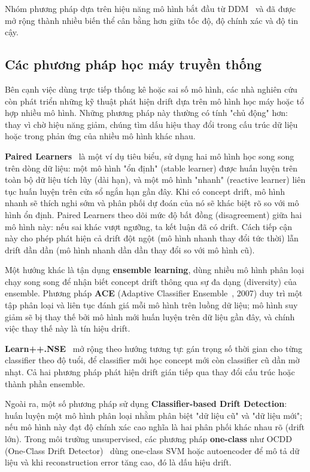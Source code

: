 Nhóm phương pháp dựa trên hiệu năng mô hình bắt đầu từ DDM~\cite{gama2004learning} và đã được mở rộng thành nhiều biến thể cân bằng hơn giữa tốc độ, độ chính xác và độ tin cậy.

\subsection{Các phương pháp học máy truyền thống}
Bên cạnh việc dùng trực tiếp thống kê hoặc sai số mô hình, các nhà nghiên cứu còn phát triển những kỹ thuật phát hiện drift dựa trên
mô hình học máy hoặc tổ hợp nhiều mô hình. Những phương pháp này thường có tính "chủ động" hơn: thay vì chờ hiệu năng giảm, chúng tìm
dấu hiệu thay đổi trong cấu trúc dữ liệu hoặc trong phản ứng của nhiều mô hình khác nhau.

\textbf{Paired Learners}~\cite{bach2008paired} là một ví dụ tiêu biểu, sử dụng hai mô hình học song song trên dòng dữ liệu: một mô
hình "ổn định" (stable learner) được huấn luyện trên toàn bộ dữ liệu tích lũy (dài hạn), và một mô hình "nhanh" (reactive learner) liên
tục huấn luyện trên cửa sổ ngắn hạn gần đây. Khi có concept drift, mô hình nhanh sẽ thích nghi sớm và phân phối dự đoán của nó sẽ khác
biệt rõ so với mô hình ổn định. Paired Learners theo dõi mức độ bất đồng (disagreement) giữa hai mô hình này: nếu sai khác vượt ngưỡng, ta
kết luận đã có drift. Cách tiếp cận này cho phép phát hiện cả drift đột ngột (mô hình nhanh thay đổi tức thời) lẫn drift dần dần (mô hình
nhanh dần dần thay đổi so với mô hình cũ).

Một hướng khác là tận dụng \textbf{ensemble learning}, dùng nhiều mô hình phân loại chạy song song để nhận biết concept drift thông qua sự đa dạng (diversity) của ensemble. Phương pháp \textbf{ACE} (Adaptive Classifier Ensemble~\cite{nishida2007ace}, 2007) duy trì một tập phân loại và liên tục đánh giá mỗi mô hình trên luồng dữ liệu; mô hình suy giảm sẽ bị thay thế bởi mô hình mới huấn luyện trên dữ liệu gần đây, và chính việc thay thế này là tín hiệu drift.

\textbf{Learn++.NSE}~\cite{elwell2011learn} mở rộng theo hướng tương tự: gán trọng số thời gian cho từng classifier theo độ tuổi, để classifier mới học concept mới còn classifier cũ dần mờ nhạt. Cả hai phương pháp phát hiện drift gián tiếp qua thay đổi cấu trúc hoặc thành phần ensemble.

Ngoài ra, một số phương pháp sử dụng \textbf{Classifier-based Drift Detection}: huấn luyện một mô hình phân loại nhằm phân biệt "dữ liệu cũ"
và "dữ liệu mới"; nếu mô hình này đạt độ chính xác cao nghĩa là hai phân phối khác nhau rõ (drift lớn). Trong môi trường unsupervised, các
phương pháp \textbf{one-class} như OCDD (One-Class Drift Detector)~\cite{gozuacik2021ocdd} dùng one-class SVM hoặc autoencoder để mô tả dữ liệu và khi reconstruction error
tăng cao, đó là dấu hiệu drift.

